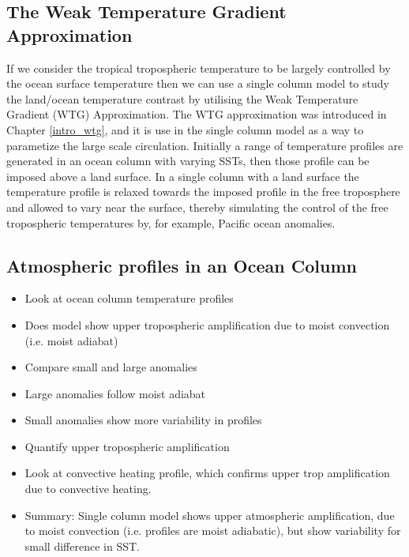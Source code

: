 \subsection{The Weak Temperature Gradient Approximation}
If we consider the tropical tropospheric temperature to be largely controlled by 
the ocean surface temperature then we can use a single column model to study the 
land/ocean temperature contrast by utilising the Weak Temperature Gradient (WTG) 
Approximation. The WTG approximation was introduced in Chapter \ref{intro_wtg}, 
and it is use in the single column model as a way to parametize the large scale 
circulation.
Initially a range of temperature profiles are generated in an ocean column with 
varying SSTs, then those profile can be imposed above a land surface.  In a 
single column with a land surface the temperature profile is relaxed towards the 
imposed profile in the free troposphere and allowed to vary near the surface, 
thereby simulating the control of the free tropospheric temperatures by, for 
example, Pacific ocean anomalies.

\subsection{Atmospheric profiles in an Ocean Column}
\begin{itemize}
	\item Look at ocean column temperature profiles
	\item Does model show upper tropospheric amplification due to moist 
		convection (i.e. moist adiabat)
	\item Compare small and large anomalies
	\item Large anomalies follow moist adiabat
	\item Small anomalies show more variability in profiles
	\item Quantify upper tropospheric amplification
	\item Look at convective heating profile, which confirms upper trop 
		amplification due to convective heating.
	\item Summary: Single column model shows upper atmospheric amplification, 
		due to moist convection (i.e. profiles are moist adiabatic), but show 
		variability for small difference in SST.
\end{itemize}

